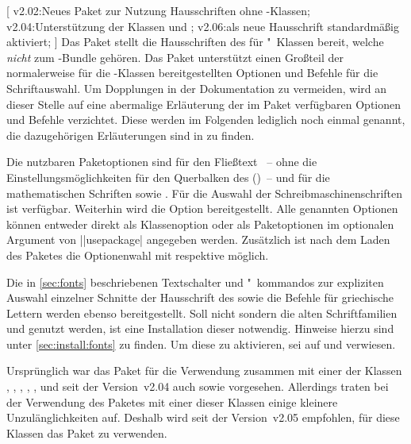\begin{DeclareEntity}{}[%
  v2.02:Neues Paket zur Nutzung Hausschriften ohne \TUDScript-Klassen;%
  v2.04:Unterstützung der Klassen  und ;%
  v2.06:\OpenSans als neue Hausschrift standardmäßig aktiviert;%
]
%
Das Paket  stellt die Hausschriften des \TUDCDs für 
"~Klassen bereit, welche \emph{nicht} zum \TUDScript-Bundle 
gehören. Das Paket unterstützt einen Großteil der normalerweise für die 
\TUDScript-Klassen bereitgestellten Optionen und Befehle für die 
Schriftauswahl. Um Dopplungen in der Dokumentation zu vermeiden, wird an dieser 
Stelle auf eine abermalige Erläuterung der im Paket  
verfügbaren Optionen und Befehle verzichtet. Diese werden im Folgenden 
lediglich noch einmal genannt, die dazugehörigen Erläuterungen sind in 
 zu finden.

Die nutzbaren Paketoptionen sind für den Fließtext ~-- ohne die 
Einstellungsmöglichkeiten für den Querbalken des \CDs ()~-- und 
für die mathematischen Schriften  sowie . 
Für die Auswahl der Schreibmaschinenschriften ist  verfügbar. 
Weiterhin wird die Option  bereitgestellt. Alle genannten 
Optionen können entweder direkt als Klassenoption oder als Paketoptionen im 
optionalen Argument von 
\Macro||{usepackage|} angegeben 
werden. Zusätzlich ist nach dem Laden des Paketes die Optionenwahl mit 
 respektive  möglich.

Die in \autoref{sec:fonts} beschriebenen Textschalter und "~kommandos zur 
expliziten Auswahl einzelner Schnitte der Hausschrift des \CDs sowie die 
Befehle für griechische Lettern werden ebenso bereitgestellt.
%
Soll nicht \OpenSans sondern die alten Schriftfamilien \Univers und \DIN 
genutzt werden, ist eine Installation dieser notwendig. Hinweise hierzu sind 
unter \autoref{sec:install:fonts} zu finden. Um diese zu aktivieren, sei auf 
 und  verwiesen.

%
Ursprünglich war das Paket  für die Verwendung zusammen 
mit einer der Klassen , , , 
, ,  und seit der Version~v2.04 
auch  sowie  vorgesehen. Allerdings 
traten bei der Verwendung des Paketes mit einer dieser Klassen einige kleinere 
Unzulänglichkeiten auf. Deshalb wird seit der Version~v2.05 empfohlen, für 
diese Klassen das Paket  zu verwenden.
\end{DeclareEntity}



